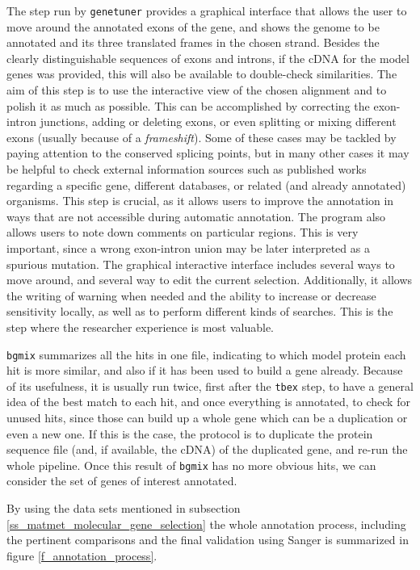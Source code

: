 The step run by \texttt{genetuner} provides a graphical interface that allows the user to move around the annotated exons of the gene, and shows the genome to be annotated and its three translated frames in the chosen strand.
Besides the clearly distinguishable sequences of exons and introns, if the cDNA for the model genes was provided, this will also be available to double-check similarities.
The aim of this step is to use the interactive view of the chosen alignment and to polish it as much as possible.
This can be accomplished by correcting the exon-intron junctions, adding or deleting exons, or even splitting or mixing different exons (usually because of a \emph{frameshift}).
Some of these cases may be tackled by paying attention to the conserved splicing points, but in many other cases it may be helpful to check external information sources such as published works regarding a specific gene, different databases, or related (and already annotated) organisms.
This step is crucial, as it allows users to improve the annotation in ways that are not accessible during automatic annotation. The program also allows users to note down comments on particular regions. This is very important, since a wrong exon-intron union may be later interpreted as a spurious mutation.
The graphical interactive interface includes several ways to move around, and several way to edit the current selection.
Additionally, it allows the writing of warning when needed and the ability to increase or decrease sensitivity locally, as well as to perform different kinds of searches.
This is the step where the researcher experience is most valuable.

\texttt{bgmix} summarizes all the hits in one file, indicating to which model protein each hit is more similar, and also if it has been used to build a gene already.
Because of its usefulness, it is usually run twice, first after the \texttt{tbex} step, to have a general idea of the best match to each hit, and once everything is annotated, to check for unused hits, since those can build up a whole gene which can be a duplication or even a new one.
If this is the case, the protocol is to duplicate the protein sequence file (and, if available, the cDNA) of the duplicated gene, and re-run the whole pipeline.
Once this result of \texttt{bgmix} has no more obvious hits, we can consider the set of genes of interest annotated.

By using the data sets mentioned in subsection \ref{ss_matmet_molecular_gene_selection} the whole annotation process, including the pertinent comparisons and the final validation using Sanger is summarized in figure \ref{f_annotation_process}.

